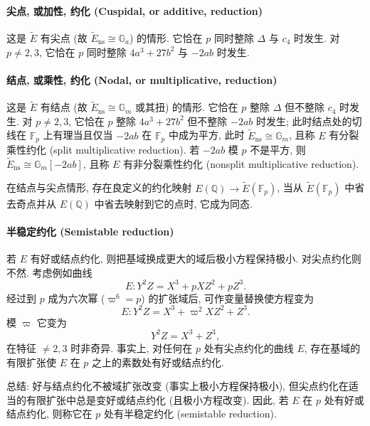 \paragraph{尖点, 或加性, 约化 (Cuspidal, or additive, reduction)}
这是 $\tilde{E}$ 有尖点 (故 $\tilde{E}_{\mathrm{ns}}\cong\mathbb{G}_a$) 的情形. 它恰在 $p$ 同时整除 $\Delta$ 与 $c_4$ 时发生. 对 $p\neq 2,3$, 它恰在 $p$ 同时整除 $4a^3 + 27b^2$ 与 $-2ab$ 时发生.

\paragraph{结点, 或乘性, 约化 (Nodal, or multiplicative, reduction)}
这是 $\tilde{E}$ 有结点 (故 $\tilde{E}_{\mathrm{ns}}\cong\mathbb{G}_m$ 或其扭) 的情形. 它恰在 $p$ 整除 $\Delta$ 但不整除 $c_4$ 时发生. 对 $p\neq 2,3$, 它恰在 $p$ 整除 $4a^3 + 27b^2$ 但不整除 $-2ab$ 时发生; 此时结点处的切线在 $\mathbb{F}_p$ 上有理当且仅当 $-2ab$ 在 $\mathbb{F}_p$ 中成为平方, 此时 $\tilde{E}_{\mathrm{ns}}\cong\mathbb{G}_m$, 且称 $E$ 有分裂乘性约化 (split multiplicative reduction). 若 $-2ab$ 模 $p$ 不是平方, 则 $\tilde{E}_{\mathrm{ns}}\cong\mathbb{G}_m[-2ab]$, 且称 $E$ 有非分裂乘性约化 (nonsplit multiplicative reduction).

在结点与尖点情形, 存在良定义的约化映射 $E(\mathbb{Q})\to\tilde{E}(\mathbb{F}_p)$, 当从 $\tilde{E}(\mathbb{F}_p)$ 中省去奇点并从 $E(\mathbb{Q})$ 中省去映射到它的点时, 它成为同态.

\paragraph{半稳定约化 (Semistable reduction)}
若 $E$ 有好或结点约化, 则把基域换成更大的域后极小方程保持极小. 对尖点约化则不然. 考虑例如曲线
\[
E\colon Y^2Z = X^3 + pXZ^2 + pZ^3.
\]
经过到 $p$ 成为六次幂 ($\varpi^6 = p$) 的扩张域后, 可作变量替换使方程变为
\[
E\colon Y^2Z = X^3 + \varpi^2XZ^2 + Z^3.
\]
模 $\varpi$ 它变为
\[
Y^2Z = X^3 + Z^3,
\]
在特征 $\neq 2,3$ 时非奇异. 事实上, 对任何在 $p$ 处有尖点约化的曲线 $E$, 存在基域的有限扩张使 $E$ 在 $p$ 之上的素数处有好或结点约化.

总结: 好与结点约化不被域扩张改变 (事实上极小方程保持极小), 但尖点约化在适当的有限扩张中总是变好或结点约化 (且极小方程改变). 因此, 若 $E$ 在 $p$ 处有好或结点约化, 则称它在 $p$ 处有半稳定约化 (semistable reduction).

